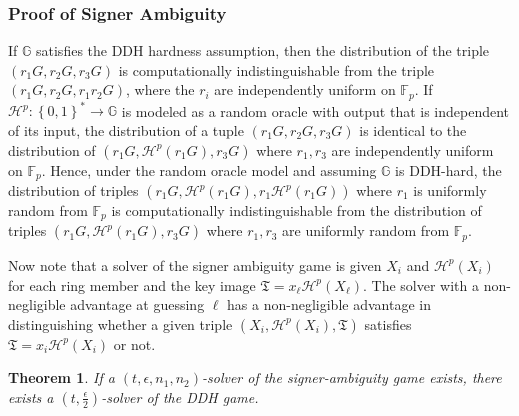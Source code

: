 \documentclass{mrl}
\theoremstyle{plain}
\newtheorem{theorem}{Theorem}[section]
\theoremstyle{definition}
\begin{document}
\subsubsection{Proof of Signer Ambiguity}
If $\mathbb{G}$ satisfies the DDH hardness assumption, then the distribution of the triple $(r_1G, r_2G, r_3G)$ is computationally indistinguishable from the triple $(r_1G, r_2G, r_1r_2G)$,  where the $r_i$ are independently uniform on $\mathbb{F}_p$. If $\mathcal{H}^p: \left\{0,1\right\}^* \to \mathbb{G}$ is modeled as a random oracle with output that is independent of its input, the distribution of a tuple $(r_1G, r_2G, r_3G)$ is identical to the distribution of $(r_1G, \mathcal{H}^p(r_1G), r_3G)$ where $r_1, r_3$ are independently uniform on $\mathbb{F}_p$. Hence, under the random oracle model and assuming $\mathbb{G}$ is DDH-hard, the distribution of triples $(r_1G, \mathcal{H}^p(r_1G), r_1\mathcal{H}^p(r_1G))$ where $r_1$ is uniformly random from $\mathbb{F}_p$ is computationally indistinguishable from the distribution of triples $(r_1G, \mathcal{H}^p(r_1G), r_3G)$ where $r_1, r_3$ are uniformly random from $\mathbb{F}_p$.
  
Now note that a solver of the signer ambiguity game is given $X_i$ and $\mathcal{H}^p(X_i)$ for each ring member and the key image $\mathfrak{T} = x_\ell \mathcal{H}^p(X_\ell)$. The solver with a non-negligible advantage at guessing $\ell$ has a non-negligible advantage in distinguishing whether a given triple $(X_i, \mathcal{H}^p(X_i), \mathfrak{T})$ satisfies $\mathfrak{T} = x_i \mathcal{H}^p(X_i)$ or not.

\begin{theorem}
If a $(t, \epsilon, n_1, n_2)$-solver of the signer-ambiguity game exists, there exists a $(t, \frac{\epsilon}{2})$-solver of the DDH game. 
\end{theorem}
\end{document}
